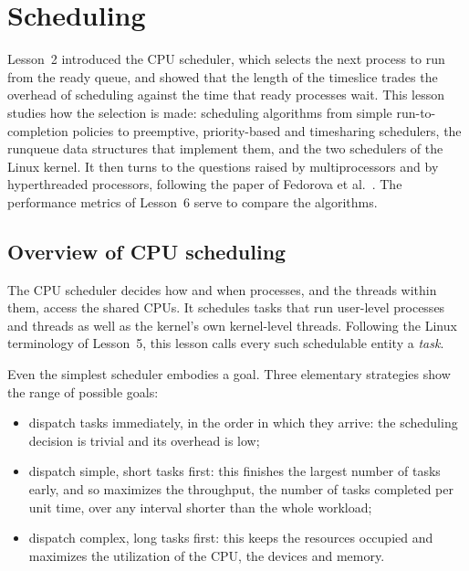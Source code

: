 \documentclass[../main.tex]{subfiles}
\begin{document}
\chapter{Scheduling}

Lesson~2 introduced the CPU scheduler, which selects the next process to
run from the ready queue, and showed that the length of the timeslice trades
the overhead of scheduling against the time that ready processes wait.  This
lesson studies how the selection is made: scheduling algorithms from simple
run-to-completion policies to preemptive, priority-based and timesharing
schedulers, the runqueue data structures that implement them, and the two
schedulers of the Linux kernel.  It then turns to the questions raised by
multiprocessors and by hyperthreaded processors, following the paper of
Fedorova et al.\ \cite{fedorova2004}.  The performance metrics of Lesson~6
serve to compare the algorithms.

\section{Overview of CPU scheduling}
\label{sec:l07-overview}

The CPU scheduler decides how and when processes, and the threads within
them, access the shared CPUs.  It schedules tasks that
run user-level processes and threads as well as the kernel's own
kernel-level threads.  Following the Linux terminology of Lesson~5, this
lesson calls every such schedulable entity a \emph{task}.

Even the simplest scheduler embodies a goal.  Three elementary strategies
show the range of possible goals:
\begin{itemize}
  \item dispatch tasks immediately, in the order in which they arrive: the
    scheduling decision is trivial and its overhead is low;
  \item dispatch simple, short tasks first: this finishes the largest number
    of tasks early, and so maximizes the throughput, the number of tasks
    completed per unit time, over any interval shorter than the whole
    workload;
  \item dispatch complex, long tasks first: this keeps the resources
    occupied and maximizes the utilization of the CPU, the devices and
    memory.
\end{itemize}
\end{document}
